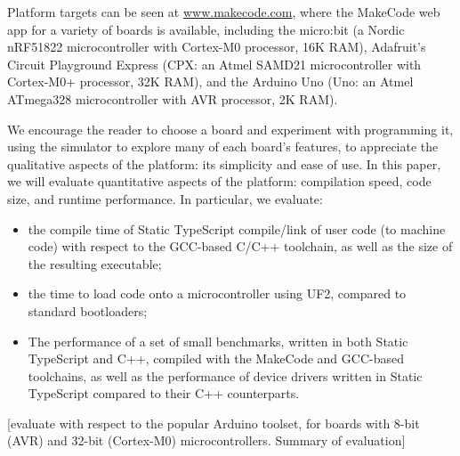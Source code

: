 Platform targets can be seen at \url{www.makecode.com}, where the MakeCode web app for a variety of boards is available, 
including the micro:bit (a Nordic nRF51822 microcontroller with Cortex-M0 processor, 16K RAM), Adafruit's Circuit 
Playground Express (CPX: an Atmel SAMD21 microcontroller with Cortex-M0+ processor, 32K RAM), and the Arduino Uno 
(Uno: an Atmel ATmega328 microcontroller with AVR processor, 2K RAM). 

We encourage the reader to choose a board and experiment with programming it, using the simulator to explore many 
of each board's features, to appreciate the qualitative aspects of the platform: its simplicity and ease of use.  In this 
paper, we will evaluate quantitative aspects of the platform: 
compilation speed, code size, and runtime performance.  In particular, we evaluate:
\begin{itemize}
\item the compile time of Static TypeScript compile/link of user code (to machine code) with respect 
      to the GCC-based C/C++ toolchain, as well as the size of the resulting executable;
\item the time to load code onto a microcontroller using UF2, compared to standard bootloaders; 
\item The performance of a set of small benchmarks, written in both Static TypeScript and C++,
      compiled with the MakeCode and GCC-based toolchains, as well as the performance of device drivers
      written in Static TypeScript compared to their C++ counterparts.
\end{itemize}
[evaluate with respect to the popular Arduino toolset, for boards with 8-bit (AVR) and 32-bit (Cortex-M0) microcontrollers. 
Summary of evaluation]


